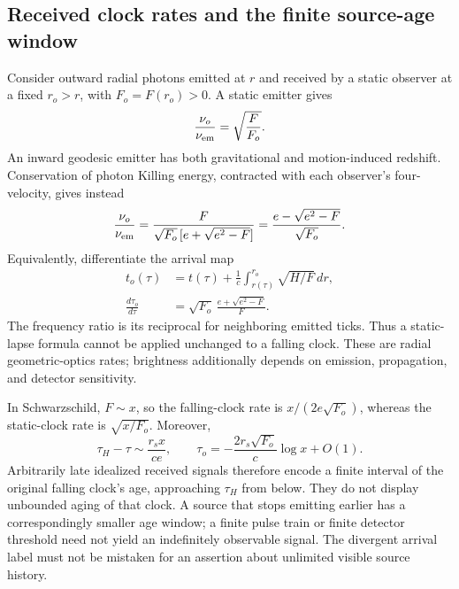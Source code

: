 \documentclass[10pt,twocolumn,letterpaper]{article}
\begin{document}
\subsection{Received clock rates and the finite source-age window}
Consider outward radial photons emitted at $r$ and received by a static
observer at a fixed $r_o>r$, with $F_o=F(r_o)>0$. A static emitter gives
\begin{equation}
 \frac{\nu_o}{\nu_{\rm em}}=\sqrt{\frac F{F_o}}.
 \label{eq:ch5-static-redshift}
\end{equation}
An inward geodesic emitter has both gravitational and motion-induced
redshift. Conservation of photon Killing energy, contracted with each
observer's four-velocity, gives instead
\begin{equation}
 \frac{\nu_o}{\nu_{\rm em}}
 =\frac{F}{\sqrt{F_o}\,[e+\sqrt{e^2-F}]}
 =\frac{e-\sqrt{e^2-F}}{\sqrt{F_o}}.
 \label{eq:ch5-falling-redshift}
\end{equation}
Equivalently, differentiate the arrival map
\begin{equation}
 \begin{aligned}
 t_o(\tau)&=t(\tau)+\frac1c\int_{r(\tau)}^{r_o}\sqrt{H/F}\,dr,\\
 \frac{d\tau_o}{d\tau}&=\sqrt{F_o}\,\frac{e+\sqrt{e^2-F}}F.
 \end{aligned}
 \label{eq:ch5-arrival-map}
\end{equation}
The frequency ratio is its reciprocal for neighboring emitted ticks.
Thus a static-lapse formula cannot be applied unchanged to a falling clock.
These are radial geometric-optics rates; brightness additionally depends
on emission, propagation, and detector sensitivity.

In Schwarzschild, $F\sim x$, so the falling-clock rate is
$x/(2e\sqrt{F_o})$, whereas the static-clock rate is
$\sqrt{x/F_o}$. Moreover,
\begin{equation}
 \tau_H-\tau\sim\frac{r_s x}{ce},\qquad
 \tau_o=-\frac{2r_s\sqrt{F_o}}c\log x+O(1).
 \label{eq:ch5-late-arrivals}
\end{equation}
Arbitrarily late idealized received signals therefore encode a finite
interval of the original falling clock's age, approaching $\tau_H$ from
below. They do not display unbounded aging of that clock. A source that
stops emitting earlier has a correspondingly smaller age window; a finite
pulse train or finite detector threshold need not yield an indefinitely
observable signal. The divergent arrival label must not be mistaken for
an assertion about unlimited visible source history.
\end{document}
